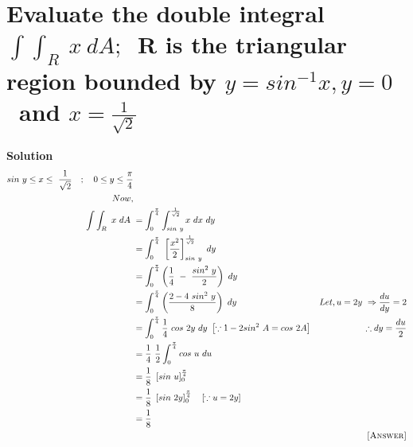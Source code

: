 \documentclass[12pt]{article}
\begin{document}
\section{Evaluate the double integral $\int\int_{R}\ x\ dA;$\ R is the triangular region bounded by $y=sin^{-1}x, y=0$\ and $x=\frac{1}{\sqrt{2}}$}




\textbf{Solution}
\begin{align*}
    sin\ y\leq x\leq\ \frac{1}{\sqrt{2}} \quad ;\quad 0\leq y\leq \frac{\pi}{4}\\
    Now,\\
    \int\int_{R}\ x\ dA\ 
    &=\int_{0}^{\frac{\pi}{4}}\int_{sin\ y}^{\frac{1}{\sqrt{2}}}x\ dx\ dy\\
    &=\int_{0}^{\frac{\pi}{4}}\ \left[\frac{x^2}{2}\right]_{sin\ y}^{\frac{1}{\sqrt{2}}}\ dy\\
    &=\int_{0}^{\frac{\pi}{4}}\left(\frac{1}{4}\ -\ \frac{sin^2\ y}{2}\right)\ dy\\
    &=\int_{0}^{\frac{\pi}{4}}\left(\frac{2-4\ sin^2\ y}{8}\right)\ dy & Let, u=2y\ \Rightarrow\frac{du}{dy}=2\\
    &=\int_{0}^{\frac{\pi}{4}}\frac{1}{4}\ cos\ 2y\ dy\ \left[\because1-2sin^2\ A=cos\ 2A\right] & \therefore dy=\frac{du}{2}\\
    &=\frac{1}{4}\ \frac{1}{2}\int_{0}^{\frac{\pi}{4}}cos\ u\ du\\
    &=\frac{1}{8}\ \left[sin\ u\right]_{0}^{\frac{\pi}{4}}\\
    &=\frac{1}{8}\ \left[sin\ 2y\right]_{0}^{\frac{\pi}{4}} \quad \left[\because u=2y\right]\\
    &=\frac{1}{8}\\
    & & \textsc{[Answer]}
\end{align*}
\end{document}
